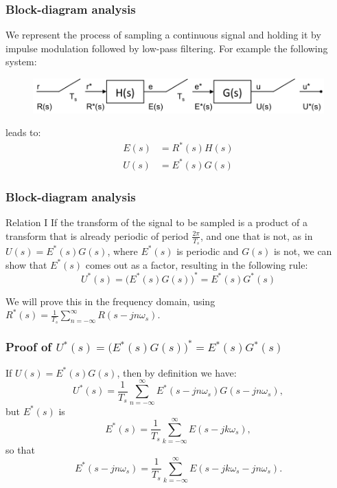 \begin{frame}
	\frametitle{Block-diagram analysis}
	\justify
	We represent the process of sampling a continuous signal and holding it by impulse modulation followed by low-pass filtering. For example the following system: 
	\vspace{1em}
	\begin{figure}
		\centering
		\includegraphics[width=1\linewidth]{block_analysis_1}
		\vspace{0.5em}
	\end{figure}
	leads to:
	\begin{equation}
		\begin{split}
		E(s) &= R^{*}(s)H(s)\\
		U(s) &= E^{*}(s)G(s)
		\end{split}
	\end{equation}
\end{frame}

\begin{frame}
	\frametitle{Block-diagram analysis}
	\begin{block}{Relation I}
		\justify
		If the transform of the signal to be sampled is a product of a transform that is already periodic of period $\frac{2\pi}{T_s}$, and one that is not, as in $U(s) = E^{*}(s)G(s)$, where $E^{*}(s)$ is periodic and $G(s)$ is not, we can show that $E^{*}(s)$ comes out as a factor, resulting in the following rule: 
		\begin{equation}
		U^{*}(s) = \big(E^{*}(s)G(s)\big)^{*} = E^{*}(s)G^{*}(s)
		\end{equation}
	\end{block}
	\vspace{1em}
	We will prove this in the frequency domain, using $R^*(s)=\frac{1}{T_s}\sum_{n=-\infty}^{\infty}R(s-jn\omega_s)$.\\
\end{frame}

\begin{frame}
	\frametitle{Proof of $U^{*}(s) = \big(E^{*}(s)G(s)\big)^{*} = E^{*}(s)G^{*}(s)$}
	If $U(s) = E^{*}(s)G(s)$, then by definition we have:
	\begin{equation}
	U^{*}(s) = \frac{1}{T_s} \sum_{n=-\infty}^{\infty} E^{*}(s - jn\omega_s)G(s - jn\omega_s),
	\end{equation}
	but $E^{*}(s)$ is
	\begin{equation}
	E^{*}(s) = \frac{1}{T_s} \sum_{k=-\infty}^{\infty} E(s-jk\omega_s),
	\end{equation}
	so that
	\begin{equation}
	E^{*}(s-jn\omega_s) = \frac{1}{T_s} \sum_{k=-\infty}^{\infty} E(s - jk\omega_s - jn\omega_s).
	\end{equation}
\end{frame}

